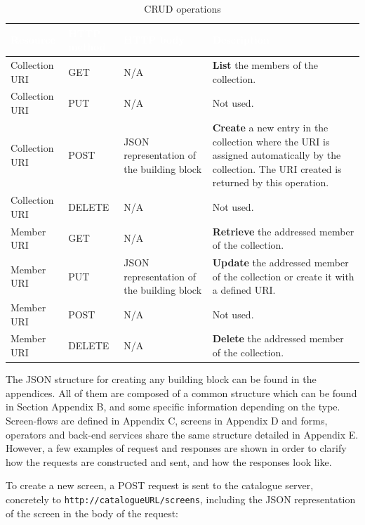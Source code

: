 \documentclass{fast_latex}
\begin{document}
\begin{table}[htb!]
\caption{CRUD operations}
\label{tab:crud_operations}
\begin{center}
\begin{tabular}{|p{2.5cm}|p{2.5cm}|p{3.5cm}|p{5cm}|}
\hline
\rowcolor{fast@lightgrey}\textcolor{white}{Resource} &
                         \textcolor{white}{HTTP method} &
                         \textcolor{white}{HTTP body} &
                         \textcolor{white}{Description}\\ \hline
Collection URI & GET & N/A & \textbf{List} the members of the collection.\\ \hline
Collection URI & PUT & N/A & Not used.\\ \hline
Collection URI & POST & JSON representation of the building block & \textbf{Create} a new entry in the collection where the URI is assigned automatically by the collection. The URI created is returned by this operation.\\ \hline
Collection URI & DELETE & N/A & Not used.\\ \hline
Member URI & GET & N/A & \textbf{Retrieve} the addressed member of the collection.\\ \hline
Member URI & PUT & JSON representation of the building block & \textbf{Update} the addressed member of the collection or create it with a defined URI.\\ \hline
Member URI & POST & N/A & Not used. \\ \hline
Member URI & DELETE & N/A & \textbf{Delete} the addressed member of the collection.\\ \hline
\end{tabular}
\end{center}
\end{table}

The JSON structure for creating any building block can be found in the appendices. All of them are composed of a common structure which can be found in Section Appendix B, and some specific information depending on the type. Screen-flows are defined in Appendix C, screens in Appendix D and forms, operators and back-end services share the same structure detailed in Appendix E. However, a few examples of request and responses are shown in order to clarify how the requests are constructed and sent, and how the responses look like.

To create a new screen, a POST request is sent to the catalogue server, concretely to \texttt{http://cata\-logueURL/screens}, including the JSON representation of the screen in the body of the request:
\end{document}
